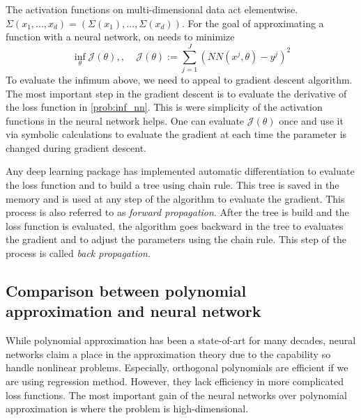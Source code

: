 \documentclass[11pt]{book}
\begin{document}
The activation functions on multi-dimensional data act elementwise. $\Sigma(x_1,...,x_d)=(\Sigma(x_1),...,\Sigma(x_d))$.
For the goal of approximating a function with a neural network, on needs to minimize 
\begin{equation}\label{prob:inf_nn}
    \inf_{\theta}\mathcal{J}(\theta),,~~~~~\mathcal{J}(\theta):=\sum_{j=1}^J\left(NN(x^j,\theta)-y^j\right)^2
\end{equation}
To evaluate the infimum above, we need to appeal to gradient descent algorithm. The most important step in the gradient descent is to evaluate the derivative of the loss function in \eqref{prob:inf_nn}. This is were simplicity of the activation functions in the neural network helps. One can evaluate $\mathcal{J}(\theta)$ once and use it via symbolic calculations to evaluate the gradient at each time the parameter is changed during gradient descent. 
\begin{algorithm}
        \caption{Gradient descent}
        \label{alg:gd_nn}
        \caption{Gradient descent algorithm for neural networks}
\end{algorithm}
Any deep learning package has implemented automatic differentiation to evaluate the loss function and to build a tree using chain rule. This tree is saved in the memory and is used at any step of the algorithm to evaluate the gradient. This process is also referred to as \emph{forward propagation}. After the tree is build and the loss function is evaluated, the algorithm goes backward in the tree to evaluates the gradient and to adjust the parameters using the chain rule. This step of the process is called \emph{back propagation}.

\subsection{Comparison between polynomial approximation and neural network}
While polynomial approximation has been a state-of-art for many decades, neural networks claim a place in the approximation theory due to the capability so handle nonlinear problems. Especially, orthogonal polynomials are efficient if we are using regression method. However, they lack efficiency in more complicated loss functions. The most important gain of the neural networks over polynomial approximation is where the problem is high-dimensional. 
\end{document}
